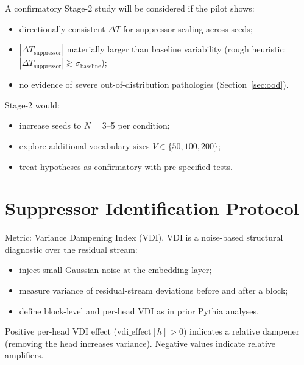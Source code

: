 \documentclass[11pt]{article}
\begin{document}
A confirmatory Stage-2 study will be considered if the pilot shows:
\begin{itemize}
  \item directionally consistent $\Delta T$ for suppressor scaling across seeds;
  \item $|\Delta T_{\text{suppressor}}|$ materially larger than baseline variability (rough heuristic: $|\Delta T_{\text{suppressor}}| \gtrsim \sigma_{\text{baseline}}$);
  \item no evidence of severe out-of-distribution pathologies (Section~\ref{sec:ood}).
\end{itemize}

Stage-2 would:
\begin{itemize}
  \item increase seeds to $N = 3$--5 per condition;
  \item explore additional vocabulary sizes $V \in \{50, 100, 200\}$;
  \item treat hypotheses as confirmatory with pre-specified tests.
\end{itemize}

\section{Suppressor Identification Protocol}

Metric: Variance Dampening Index (VDI). VDI is a noise-based structural diagnostic over the residual stream:
\begin{itemize}
  \item inject small Gaussian noise at the embedding layer;
  \item measure variance of residual-stream deviations before and after a block;
  \item define block-level and per-head VDI as in prior Pythia analyses.
\end{itemize}

Positive per-head VDI effect ($\mathrm{vdi\_effect}[h] > 0$) indicates a relative dampener (removing the head increases variance). Negative values indicate relative amplifiers.
\end{document}
